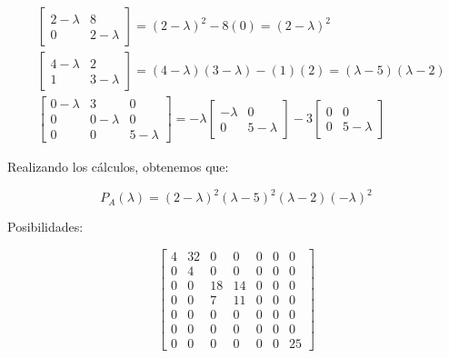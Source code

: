 \documentclass{report}
\begin{document}
\begin{enumerate}
\begin{enumerate}
            \[
            \begin{aligned}
            &\begin{bmatrix}
            2-\lambda & 8 \\
            0 & 2-\lambda
            \end{bmatrix} = (2-\lambda)^{2}-8(0) = (2-\lambda)^{2} \\
            &\begin{bmatrix}
            4-\lambda & 2 \\
            1 & 3-\lambda
            \end{bmatrix} = (4-\lambda)(3-\lambda)-(1)(2) = (\lambda-5)(\lambda-2) \\
            &\begin{bmatrix}
            0-\lambda & 3 & 0 \\
            0 & 0-\lambda & 0 \\
            0 & 0 & 5-\lambda
            \end{bmatrix} = -\lambda
            \begin{bmatrix}
            -\lambda & 0 \\
            0 & 5-\lambda
            \end{bmatrix} - 3
            \begin{bmatrix}
            0 & 0 \\
            0 & 5-\lambda
            \end{bmatrix}
            \end{aligned}
            \]
            
            Realizando los cálculos, obtenemos que:
            
            \[
            P_{A}(\lambda) = (2-\lambda)^{2}(\lambda-5)^{2}(\lambda-2)(-\lambda)^{2}
            \]
            
            Posibilidades:
            
            \[
            \begin{bmatrix}
            4 & 32 & 0 & 0 & 0 & 0 & 0 \\
            0 & 4 & 0 & 0 & 0 & 0 & 0 \\
            0 & 0 & 18 & 14 & 0 & 0 & 0 \\
            0 & 0 & 7 & 11 & 0 & 0 & 0 \\
            0 & 0 & 0 & 0 & 0 & 0 & 0 \\
            0 & 0 & 0 & 0 & 0 & 0 & 0 \\
            0 & 0 & 0 & 0 & 0 & 0 & 25
            \end{bmatrix}
            \]
            

\end{enumerate}
\end{enumerate}
\end{document}
